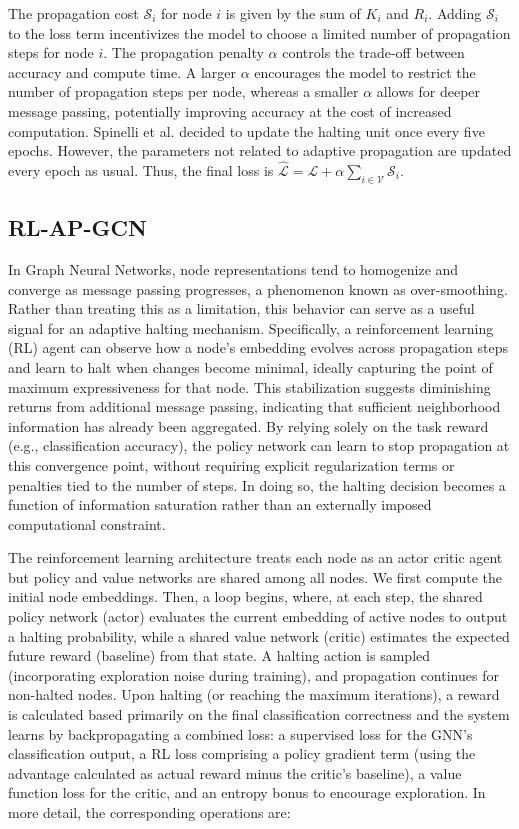 \documentclass{gdl}
\begin{document}
 The propagation cost $\mathcal{S}_i$ for node $i$ is given by the sum of $K_i$ and $R_i$. Adding $\mathcal{S}_i$ to the loss term incentivizes the model to choose a limited number of propagation steps for node $i$. The propagation penalty $\alpha$ controls the trade-off between accuracy and compute time. A larger $\alpha$ encourages the model to restrict the number of propagation steps per node, whereas a smaller $\alpha$ allows for deeper message passing, potentially improving accuracy at the cost of increased computation. Spinelli et al. decided to update the halting unit once every five epochs. However, the parameters not related to adaptive propagation are updated every epoch as usual. Thus, the final loss is $ \mathcal{\hat{L}} = \mathcal{L} + \alpha \sum_{i\in \mathcal{V}} \mathcal{S}_i $.


\subsection{RL-AP-GCN}
In Graph Neural Networks, node representations tend to homogenize and converge as message passing progresses, a phenomenon known as over-smoothing. Rather than treating this as a limitation, this behavior can serve as a useful signal for an adaptive halting mechanism. Specifically, a reinforcement learning (RL) agent can observe how a node's embedding evolves across propagation steps and learn to halt when changes become minimal, ideally capturing the point of maximum expressiveness for that node. This stabilization suggests diminishing returns from additional message passing, indicating that sufficient neighborhood information has already been aggregated. By relying solely on the task reward (e.g., classification accuracy), the policy network can learn to stop propagation at this convergence point, without requiring explicit regularization terms or penalties tied to the number of steps. In doing so, the halting decision becomes a function of information saturation rather than an externally imposed computational constraint.

The reinforcement learning architecture treats each node as an actor critic agent but policy and value networks are shared among all nodes. We first compute the initial node embeddings. Then, a loop begins, where, at each step, the shared policy network (actor) evaluates the current embedding of active nodes to output a halting probability, while a shared value network (critic) estimates the expected future reward (baseline) from that state. A halting action is sampled (incorporating exploration noise during training), and propagation continues for non-halted nodes. Upon halting (or reaching the maximum iterations), a reward is calculated based primarily on the final classification correctness and the system learns by backpropagating a combined loss: a supervised loss for the GNN's classification output, a RL loss comprising a policy gradient term (using the advantage calculated as actual reward minus the critic's baseline), a value function loss for the critic, and an entropy bonus to encourage exploration. In more detail, the corresponding operations are: 
\end{document}
